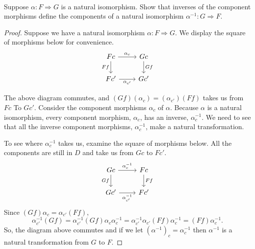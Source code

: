\documentclass[main.tex]{subfiles}
\begin{document}
\paragraph{}
\begin{exercise}
	Suppose $\alpha: F \Rightarrow G$ is a natural isomorphism. Show that inverses
	of the component morphisms define the components of a natural isomorphism
	$\alpha^{-1}: G \Rightarrow F$.
\end{exercise}

\begin{proof}
	Suppose we have a natural isomorphism $\alpha: F \Rightarrow G$. We display
	the square of morphisms below for convenience.
	\[\begin{tikzcd}
			Fc \arrow{r}{\alpha_{c}} \arrow[swap]{d}{Ff}  &
			Gc \arrow{d}{Gf} \\
			Fc' \arrow[swap]{r}{\alpha_{c'}} &
			Gc'
	\end{tikzcd}\]

	The above diagram commutes, and $(Gf)(\alpha_{c})=(\alpha_{c'})(Ff)$ takes
	us from $Fc$ To $Gc'$. Consider the component morphisms $\alpha_{c}$ of
	$\alpha$. Because $\alpha$ is a natural isomorphism, every component
	morphism, $\alpha_{c}$, has an inverse,  $\alpha_{c}^{-1}$. We need to see
	that all the inverse component morphisms, $\alpha_{c}^{-1}$, make a natural
	transformation.

	To see where $\alpha_{c}^{-1}$ takes us, examine the square of morphisms
	below. All the components are still in $D$ and take us from $Gc$ to $Fc'$.
	\[\begin{tikzcd}
			Gc \arrow{r}{\alpha_{c}^{-1}} \arrow[swap]{d}{Gf}  &
			Fc \arrow{d}{Ff} \\
			Gc' \arrow[swap]{r}{\alpha_{c'}^{-1}} &
			Fc'
	\end{tikzcd}\]
	Since $(Gf)\alpha_{c}=\alpha_{c'}(Ff)$,
	\[\alpha_{c'}^{-1}(Gf)=\alpha_{c'}^{-1}(Gf)\alpha_c\alpha_c^{-1}=
	\alpha_{c'}^{-1}\alpha_{c'}(Ff)\alpha_c^{-1}=(Ff)\alpha_c^{-1}.\]
	So, the diagram above commutes and if we let $(\alpha^{-1})_c=\alpha_c^{-1}$
	then $\alpha^{-1}$ is a natural transformation from $G$ to $F$.
\end{proof}
\end{document}
